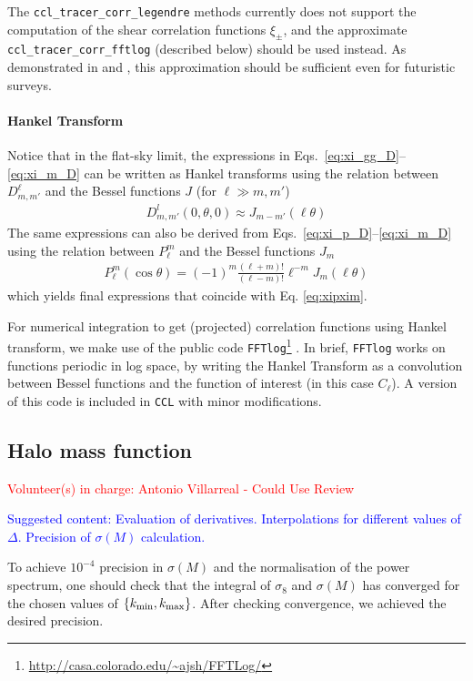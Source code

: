 \documentclass[\docopts]{\docclass}
\newcommand{\vol}[1]{\textcolor{red}{Volunteer(s) in charge: #1}}
\newcommand{\cont}[1]{\textcolor{blue}{Suggested content: #1}}
\newcommand{\ccl}{{\tt CCL}\xspace}
\begin{document}
The {\tt ccl\_tracer\_corr\_legendre} methods currently does not support the computation of the shear correlation functions $\xi_{\pm}$, and the approximate {\tt ccl\_tracer\_corr\_fftlog} (described below) should be used instead. As demonstrated in \cite{Kilbinger2017} and \cite{Kitching17}, this approximation should be sufficient even for futuristic surveys.

\paragraph{Hankel Transform}
Notice that in the flat-sky limit, the expressions in Eqs.~\ref{eq:xi_gg_D}--\ref{eq:xi_m_D} can be
written as Hankel transforms using the relation between $D_{m,m'}^\ell$ and the Bessel functions $J$
(for $\ell\gg m,m'$)
\begin{align}
  D^{l}_{m,m'}(0,\theta,0)\approx J_{m-m'}(\ell\theta)
\end{align}
The same expressions can also be derived from Eqs.~\ref{eq:xi_p_D}--\ref{eq:xi_m_D} using the relation between $P_{\ell}^m$ and the Bessel functions $J_m$
\citep{Putter2010}
\begin{align}
  P_{\ell}^m(\cos\theta)=(-1)^m\frac{(\ell+m)!}{(\ell-m)!}\ell^{-m}J_m(\ell\theta)
\end{align}
which yields final expressions that coincide with Eq. \ref{eq:xipxim}.

For numerical integration to get (projected) correlation functions using Hankel transform,
we make use of the
public code {\tt FFTlog}\footnote{\url{http://casa.colorado.edu/~ajsh/FFTLog/}}
\citep{Hamilton2000,Talman2009}. In brief, {\tt FFTlog} works on functions periodic in log space,
by writing the Hankel Transform as a convolution between Bessel functions and the function of
interest (in this case $C_\ell$). A version of this code is included in \ccl with minor
modifications.

\subsection{Halo mass function}
\vol{Antonio Villarreal - Could Use Review}

\cont{Evaluation of derivatives. Interpolations for different values of $\Delta$. Precision of $\sigma(M)$ calculation.}

To achieve $10^{-4}$ precision in $\sigma(M)$ and the normalisation of the power spectrum, one should check that the integral of $\sigma_8$ and $\sigma(M)$ has converged for the chosen values of $\{k_{\rm min},k_{\rm max}\}$. After checking convergence, we achieved the desired precision.
\end{document}

